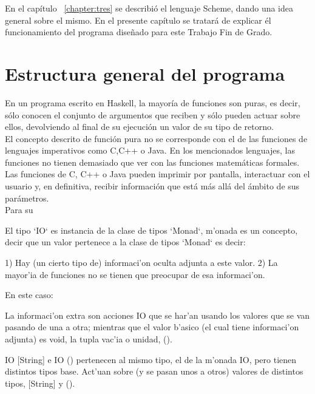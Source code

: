 

En el cap\'itulo ~\ref{chapter:tres} se describi\'o el lenguaje Scheme, dando una idea general sobre el mismo. En el presente cap\'itulo se tratar\'a de explicar \' el funcionamiento del programa diseñado para este Trabajo Fin de Grado.\\

\section{Estructura general del programa}
\label{3:sec1}

En un programa escrito en Haskell, la mayor\'ia de funciones son puras, es decir, s\'olo conocen el conjunto de argumentos que reciben y s\'olo pueden actuar sobre ellos, devolviendo al final de su ejecución un valor de su tipo de retorno.\\

El concepto descrito de funci\'on pura no se corresponde con el de las funciones de lenguajes imperativos como C,C++ o Java. En los mencionados lenguajes, las funciones no tienen demasiado que ver con las funciones matem\'aticas formales. Las funciones de C, C++ o Java pueden imprimir por pantalla, interactuar con el usuario y, en definitiva, recibir información que est\'a m\'as all\'a del \'ambito de sus par\'ametros.\\

Para su

El tipo `IO` es instancia de la clase de tipos `Monad`, m'onada es un concepto, decir que un valor pertenece a la clase de tipos `Monad` es decir:

1) Hay (un cierto tipo de) informaci'on oculta adjunta a este valor.
2) La mayor'ia de funciones no se tienen que preocupar de esa informaci'on.

En este caso:

La informaci'on extra son acciones IO que se har'an usando los valores que se van pasando de una a otra; mientras que el valor b'asico (el cual tiene informaci'on adjunta) es void, la tupla vac'ia o unidad, ().

IO [String] e IO () pertenecen al mismo tipo, el de la m'onada IO, pero tienen distintos tipos base. Act'uan sobre (y se pasan unos a otros) valores de distintos tipos, [String] y ().

